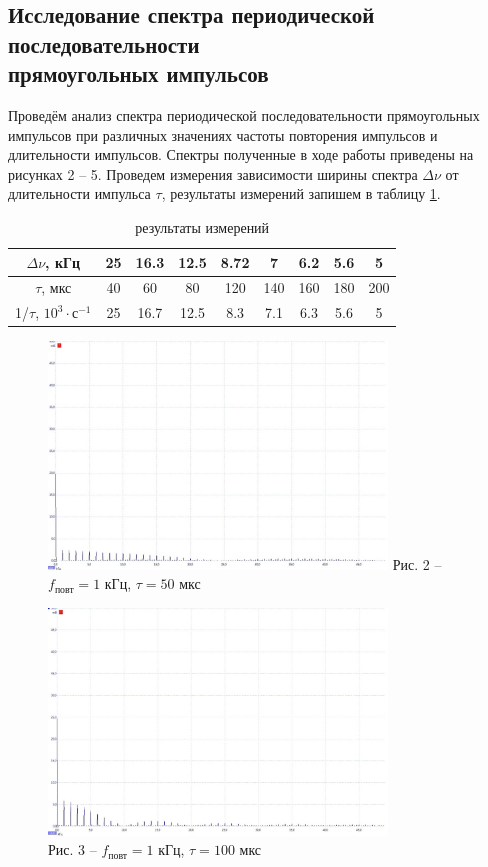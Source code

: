 \documentclass[a4paper,14pt]{article}
\begin{document}
\subsection*{Исследование спектра периодической последовательности\\ прямоугольных импульсов}

Проведём анализ спектра периодической последовательности прямоугольных импульсов при различных значениях частоты повторения импульсов и длительности импульсов. Спектры полученные в ходе работы приведены на рисунках 2 -- 5.
Проведем измерения зависимости ширины спектра $\Delta \nu$ от длительности импульса $\tau$, результаты измерений запишем в таблицу \ref{tab1}.

\begin{table}[hbt!]
	\begin{center}
	\begin{tabular}{|c|c|c|c|c|c|c|c|c|}
		\hline
		$\Delta \nu$, кГц                & 25 & 16.3 & 12.5 & 8.72 & 7   & 6.2 & 5.6 & 5   \\ \hline
		$\tau$, мкс                      & 40 & 60   & 80   & 120  & 140 & 160 & 180 & 200 \\ \hline
		1/$\tau$, $10^3 \cdot \text{с}^{-1}$ & 25 & 16.7 & 12.5 & 8.3  & 7.1 & 6.3 & 5.6 & 5   \\ \hline
	\end{tabular}
\caption{результаты измерений}
\label{tab1}
\end{center}
\end{table}

\begin{figure}[!h]
	\parbox[!h]{0.5\textwidth}{\null
		\centering
		\includegraphics[width = 9cm]{2.jpeg}
		Рис. 2 -- $f_{\text{повт}} = 1$ кГц, $\tau = 50$ мкс}
	\parbox[!h]{0.5\textwidth}{\null
		\centering
		\includegraphics[width = 9cm]{3.jpeg} \\
		Рис. 3 -- $f_{\text{повт}} = 1$ кГц, $\tau = 100$ мкс}
\end{figure}
\end{document}
